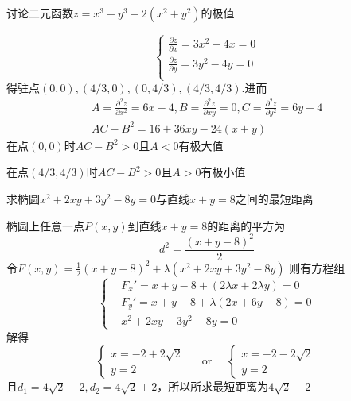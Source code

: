\documentclass{article}
\begin{document}
\begin{examplle}[]
讨论二元函数\(z=x^3+y^3-2(x^2+y^2)\)的极值

\begin{equation*}
\begin{cases}
\frac{\partial z}{\partial x}=3x^2-4x=0\\
\frac{\partial z}{\partial y}=3y^2-4y=0\\
\end{cases}
\end{equation*}
得驻点\((0,0),(4/3,0),(0,4/3),(4/3,4/3)\).进而
\begin{gather*}
A=\frac{\partial^2z}{\partial x^2}=6x-4,B=\frac{\partial^2z}{\partial xy}=0,C=\frac{\partial^2z}{\partial y^2}=6y-4\\
AC-B^2=16+36xy-24(x+y)
\end{gather*}
在点\((0,0)\)时\(AC-B^2>0\)且\(A<0\)有极大值

在点\((4/3,4/3)\)时\(AC-B^2>0\)且\(A>0\)有极小值
\end{examplle}

\begin{examplle}[]
求椭圆\(x^2+2xy+3y^2-8y=0\)与直线\(x+y=8\)之间的最短距离

椭圆上任意一点\(P(x,y)\)到直线\(x+y=8\)的距离的平方为
\begin{equation*}
d^2=\frac{(x+y-8)^2}{2}
\end{equation*}
令\(\displaystyle F(x,y)=\frac{1}{2}(x+y-8)^2+\lambda(x^2+2xy+3y^2-8y)\)
则有方程组
\begin{equation*}
\begin{cases}
&F_x'=x+y-8+(2\lambda x+2\lambda y)=0\\
&F_y' =x+y-8+\lambda(2x+6y-8)=0\\
&x^2+2xy+3y^2-8y = 0
\end{cases}
\end{equation*}
解得
\begin{equation*}
\begin{cases}
x=-2+2\sqrt{2}\\
y=2
\end{cases}\quad\text{ or }\quad
\begin{cases}
x=-2-2\sqrt{2}\\
y=2
\end{cases}
\end{equation*}
且\(d_1=4\sqrt{2}-2,d_2=4\sqrt{2}+2\)，所以所求最短距离为\(4\sqrt{2}-2\)
\end{examplle}
\end{document}
